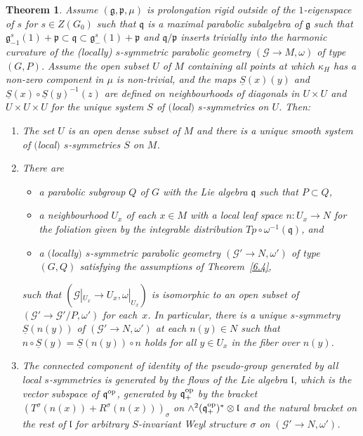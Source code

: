 \documentclass[10pt,a4paper]{amsart}
\newcommand{\om}{\omega}
\newcommand{\si}{\sigma}
\newcommand{\un}{\underline}
\newcommand{\ba}{\mathcal{G}}
\newcommand{\fg}{\mathfrak g}
\newcommand{\fv}{\mathfrak q}
\newcommand{\fp}{\mathfrak p}
\newcommand{\fl}{\mathfrak l}
\numberwithin{equation}{section}
\newtheorem{Theorem}{Theorem}[section]
\begin{document}
\begin{Theorem}\label{6.5}
Assume $(\fg,\fp,\mu)$ is prolongation rigid outside of the $1$-eigenspace of $s$ for $s\in Z(G_0)$ such that $\fv$ is a maximal parabolic subalgebra of $\fg$ such that $\fg_{-1}^s(1)+\fp\subset \fv\subset \fg_{-}^s(1)+\fp$ and $\fv/\fp$ inserts trivially into the harmonic curvature of the (locally) $s$-symmetric parabolic geometry $(\ba\to M,\om)$ of type $(G,P)$. Assume the open subset $U$ of $M$ containing all points at which $\kappa_H$ has a non-zero component in $\mu$ is non-trivial, and the maps $\un S(x)(y)$ and $\un S(x)\circ \un S(y)^{-1}(z)$ are defined on neighbourhoods of diagonals in $U\times U$ and $U\times U\times U$ for the unique system $S$ of $($local$)$ $s$-symmetries on $U$. Then:
\begin{enumerate}\itemsep=0pt
\item[$1.$] The set $U$ is an open dense subset of $M$ and there is a unique smooth system of $($local$)$ $s$-symmetries $S$ on $M$.
\item[$2.$] There are
\begin{itemize}\itemsep=0pt
\item a parabolic subgroup $Q$ of $G$ with the Lie algebra $\fv$ such that $P\subset Q$,
\item a neighbourhood $U_x$ of each $x\in M$ with a local leaf space $n\colon U_x\to N$ for the foliation given by the integrable distribution $Tp\circ \om^{-1}(\fv)$, and
\item a $($locally$)$ $s$-symmetric parabolic geometry $(\ba'\to N,\om')$ of type $(G,Q)$ satisfying the assumptions of Theorem~{\rm \ref{6.4}},
\end{itemize}
such that $(\ba|_{U_x}\to U_x,\om|_{U_x})$ is isomorphic to an open subset of $(\ba'\to \ba'/P,\om')$ for each~$x$. In particular, there is a unique $s$-symmetry $\un S(n(y))$ of $(\ba'\to N,\om')$ at each $n(y)\in N$ such that $n\circ \un S(y)=\un S(n(y))\circ n$ holds for all $y\in U_x$ in the fiber over $n(y)$.
\item[$3.$] The connected component of identity of the pseudo-group generated by all local $s$-sym\-met\-ries is generated by the flows of the Lie algebra $\fl$, which is the vector subspace of $\fv^{\rm op}$, generated by $\fv^{\rm op}_+$ by the bracket $(T^\si(n(x))+R^\si(n(x)))_\si$
on $\wedge^2 (\fv^{\rm op}_+)^*\otimes \fl$ and the natural bracket on the rest of $\fl$ for arbitrary $S$-invariant Weyl structure $\si$ on $(\ba'\to N,\om')$.


\end{enumerate}
\end{Theorem}
\end{document}
